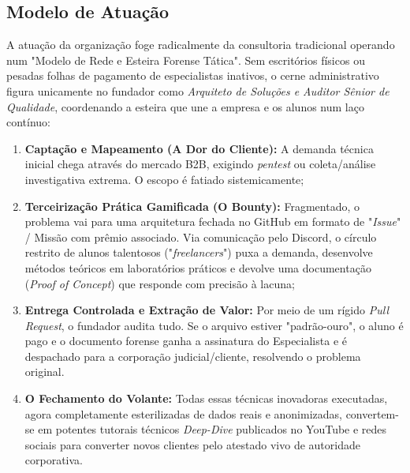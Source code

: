 \documentclass[../main.tex]{subfiles}
\begin{document}
\subsection{Modelo de Atuação}

A atuação da organização foge radicalmente da consultoria tradicional operando num "Modelo de Rede e Esteira Forense Tática". Sem escritórios físicos ou pesadas folhas de pagamento de especialistas inativos, o cerne administrativo figura unicamente no fundador como \textit{Arquiteto de Soluções e Auditor Sênior de Qualidade}, coordenando a esteira que une a empresa e os alunos num laço contínuo:

\begin{enumerate}
    \item \textbf{Captação e Mapeamento (A Dor do Cliente):} A demanda técnica inicial chega através do mercado B2B, exigindo \textit{pentest} ou coleta/análise investigativa extrema. O escopo é fatiado sistemicamente;
    \item \textbf{Terceirização Prática Gamificada (O Bounty):} Fragmentado, o problema vai para uma arquitetura fechada no GitHub em formato de "\textit{Issue}" / Missão com prêmio associado. Via comunicação pelo Discord, o círculo restrito de alunos talentosos ("\textit{freelancers}") puxa a demanda, desenvolve métodos teóricos em laboratórios práticos e devolve uma documentação (\textit{Proof of Concept}) que responde com precisão à lacuna;
    \item \textbf{Entrega Controlada e Extração de Valor:} Por meio de um rígido \textit{Pull Request}, o fundador audita tudo. Se o arquivo estiver "padrão-ouro", o aluno é pago e o documento forense ganha a assinatura do Especialista e é despachado para a corporação judicial/cliente, resolvendo o problema original.
    \item \textbf{O Fechamento do Volante:} Todas essas técnicas inovadoras executadas, agora completamente esterilizadas de dados reais e anonimizadas, convertem-se em potentes tutorais técnicos \textit{Deep-Dive} publicados no YouTube e redes sociais para converter novos clientes pelo atestado vivo de autoridade corporativa.
\end{enumerate}
\end{document}
